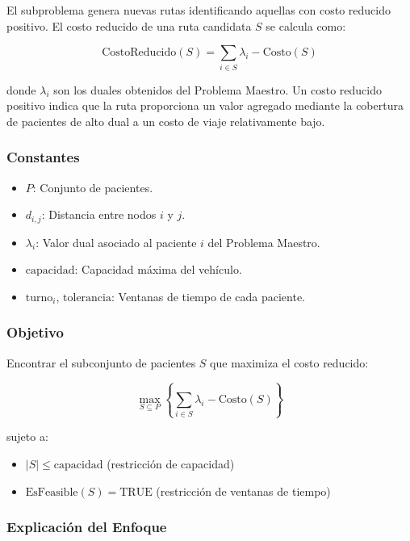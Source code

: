 \documentclass[12pt]{article}
\begin{document}
El subproblema genera nuevas rutas identificando aquellas con costo reducido positivo. El costo reducido de una ruta candidata $S$ se calcula como:

\[
\text{CostoReducido}(S) = \sum_{i \in S} \lambda_i - \text{Costo}(S)
\]

donde $\lambda_i$ son los duales obtenidos del Problema Maestro. Un costo reducido positivo indica que la ruta proporciona un valor agregado mediante la cobertura de pacientes de alto dual a un costo de viaje relativamente bajo.

\subsubsection*{Constantes}

\begin{itemize}
    \item $P$: Conjunto de pacientes.
    \item $d_{i,j}$: Distancia entre nodos $i$ y $j$.
    \item $\lambda_i$: Valor dual asociado al paciente $i$ del Problema Maestro.
    \item $\text{capacidad}$: Capacidad máxima del vehículo.
    \item $\text{turno}_i$, $\text{tolerancia}$: Ventanas de tiempo de cada paciente.
\end{itemize}

\subsubsection*{Objetivo}

Encontrar el subconjunto de pacientes $S$ que maximiza el costo reducido:

\[
\max_{S \subseteq P} \left\{ \sum_{i \in S} \lambda_i - \text{Costo}(S) \right\}
\]

sujeto a:

\begin{itemize}
    \item $|S| \leq \text{capacidad}$ (restricción de capacidad)
    \item $\text{EsFeasible}(S) = \text{TRUE}$ (restricción de ventanas de tiempo)
\end{itemize}

\subsubsection*{Explicación del Enfoque}
\end{document}
